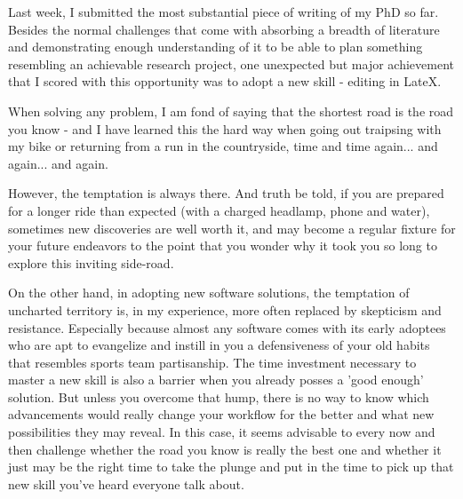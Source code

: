 \documentclass{letter}
\begin{document}

Last week, I submitted the most substantial piece of writing of my PhD so far. Besides the normal challenges that come with absorbing a breadth of literature and demonstrating enough understanding of it to be able to plan something resembling an achievable research project, one unexpected but major achievement that I scored with this opportunity was to adopt a new skill - editing in LateX. 

When solving any problem, I am fond of saying that the shortest road is the road you know - and I have learned this the hard way when going out traipsing with my bike or returning from a run in the countryside, time and time again... and again... and again. 

However, the temptation is always there. And truth be told, if you are prepared for a longer ride than expected (with a charged headlamp, phone and water), sometimes new discoveries are well worth it, and may become a regular fixture for your future endeavors to the point that you wonder why it took you so long to explore this inviting side-road.  

On the other hand, in adopting new software solutions, the temptation of uncharted territory is, in my experience, more often replaced by skepticism and resistance. Especially because almost any software comes with its early adoptees who are apt to evangelize and instill in you a defensiveness of your old habits that resembles sports team partisanship. The time investment necessary to master a new skill is also a barrier when you already posses a 'good enough' solution. But unless you overcome that hump, there is no way to know which advancements would really change your workflow for the better and what new possibilities they may reveal. In this case, it seems advisable to every now and then challenge whether the road you know is really the best one and whether it just may be the right time to take the plunge and put in the time to pick up that new skill you've heard everyone talk about.
\end{document}
